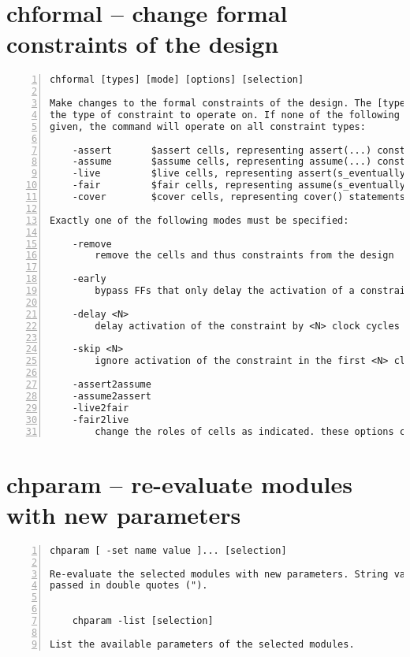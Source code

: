 \section{chformal -- change formal constraints of the design}
\label{cmd:chformal}
\begin{lstlisting}[numbers=left,frame=single]
    chformal [types] [mode] [options] [selection]

Make changes to the formal constraints of the design. The [types] options
the type of constraint to operate on. If none of the following options are
given, the command will operate on all constraint types:

    -assert       $assert cells, representing assert(...) constraints
    -assume       $assume cells, representing assume(...) constraints
    -live         $live cells, representing assert(s_eventually ...)
    -fair         $fair cells, representing assume(s_eventually ...)
    -cover        $cover cells, representing cover() statements

Exactly one of the following modes must be specified:

    -remove
        remove the cells and thus constraints from the design

    -early
        bypass FFs that only delay the activation of a constraint

    -delay <N>
        delay activation of the constraint by <N> clock cycles

    -skip <N>
        ignore activation of the constraint in the first <N> clock cycles

    -assert2assume
    -assume2assert
    -live2fair
    -fair2live
        change the roles of cells as indicated. these options can be combined
\end{lstlisting}

\section{chparam -- re-evaluate modules with new parameters}
\label{cmd:chparam}
\begin{lstlisting}[numbers=left,frame=single]
    chparam [ -set name value ]... [selection]

Re-evaluate the selected modules with new parameters. String values must be
passed in double quotes (").


    chparam -list [selection]

List the available parameters of the selected modules.
\end{lstlisting}

